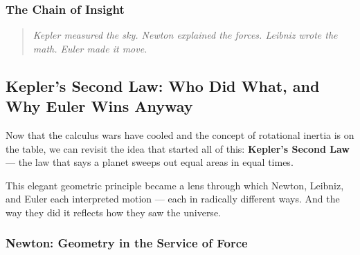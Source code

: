 \subsubsection{The Chain of Insight}

\begin{center}
\end{center}

\begin{quote}
\textit{Kepler measured the sky. Newton explained the forces. Leibniz wrote the math. Euler made it move.}
\end{quote}





\subsection{Kepler’s Second Law: Who Did What, and Why Euler Wins Anyway}

Now that the calculus wars have cooled and the concept of rotational inertia is on the table, we can revisit the idea that started all of this: \textbf{Kepler’s Second Law} — the law that says a planet sweeps out equal areas in equal times.

This elegant geometric principle became a lens through which Newton, Leibniz, and Euler each interpreted motion — each in radically different ways. And the way they did it reflects how they saw the universe.

\subsubsection*{Newton: Geometry in the Service of Force}

